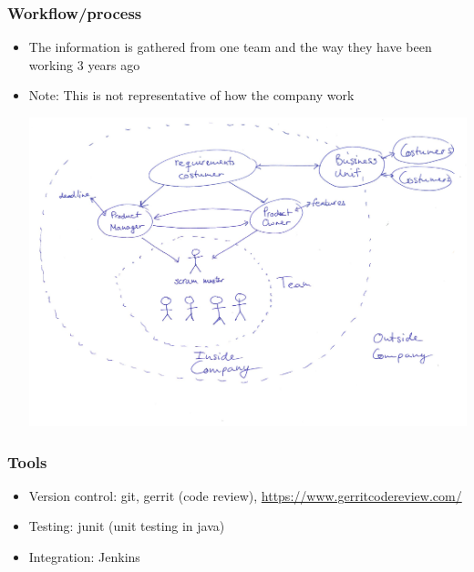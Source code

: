 \documentclass{beamer}
\begin{document}
\begin{frame}
  \frametitle{Workflow/process}
  \begin{itemize}
  \item The information is gathered from one team and the way they have been working 3 years ago 
  \item Note: This is not representative of how the company work 
  \begin{center}
    \includegraphics[width=1\textwidth]{figs/scrum_setup.pdf}
  \end{center}
  \end{itemize}
  
\end{frame}

\begin{frame}
  \frametitle{Tools}
  \begin{itemize}
  \item Version control: git, gerrit (code review), \url{https://www.gerritcodereview.com/}
  \item Testing: junit (unit
    testing in java)
  \item Integration: Jenkins
  \end{itemize}
\end{frame}
\end{document}
